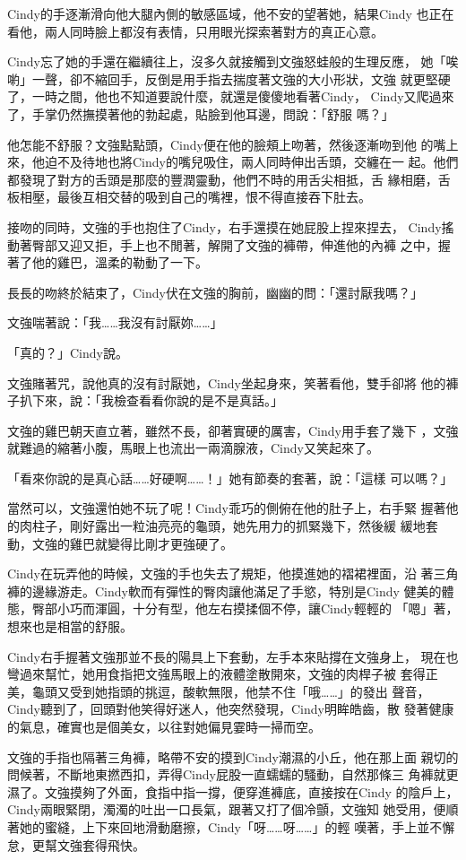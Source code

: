 Cindy的手逐漸滑向他大腿內側的敏感區域，他不安的望著她，結果Cindy
也正在看他，兩人同時臉上都沒有表情，只用眼光探索著對方的真正心意。

Cindy忘了她的手還在繼續往上，沒多久就接觸到文強怒蛙般的生理反應，
她「唉喲」一聲，卻不縮回手，反倒是用手指去揣度著文強的大小形狀，文強
就更堅硬了，一時之間，他也不知道要說什麼，就還是傻傻地看著Cindy，
Cindy又爬過來了，手掌仍然撫摸著他的勃起處，貼臉到他耳邊，問說：「舒服
嗎？」

他怎能不舒服？文強點點頭，Cindy便在他的臉頰上吻著，然後逐漸吻到他
的嘴上來，他迫不及待地也將Cindy的嘴兒吸住，兩人同時伸出舌頭，交纏在一
起。他們都發現了對方的舌頭是那麼的豐潤靈動，他們不時的用舌尖相抵，舌
緣相磨，舌板相壓，最後互相交替的吸到自己的嘴裡，恨不得直接吞下肚去。

接吻的同時，文強的手也抱住了Cindy，右手還摸在她屁股上捏來捏去，
Cindy搖動著臀部又迎又拒，手上也不閒著，解開了文強的褲帶，伸進他的內褲
之中，握著了他的雞巴，溫柔的勒動了一下。

長長的吻終於結束了，Cindy伏在文強的胸前，幽幽的問：「還討厭我嗎？」

文強喘著說：「我……我沒有討厭妳……」

「真的？」Cindy說。

文強賭著咒，說他真的沒有討厭她，Cindy坐起身來，笑著看他，雙手卻將
他的褲子扒下來，說：「我檢查看看你說的是不是真話。」

文強的雞巴朝天直立著，雖然不長，卻著實硬的厲害，Cindy用手套了幾下
，文強就難過的縮著小腹，馬眼上也流出一兩滴腺液，Cindy又笑起來了。

「看來你說的是真心話……好硬啊……！」她有節奏的套著，說：「這樣
可以嗎？」

當然可以，文強還怕她不玩了呢！Cindy乖巧的側俯在他的肚子上，右手緊
握著他的肉柱子，剛好露出一粒油亮亮的龜頭，她先用力的抓緊幾下，然後緩
緩地套動，文強的雞巴就變得比剛才更強硬了。

Cindy在玩弄他的時候，文強的手也失去了規矩，他摸進她的褶裙裡面，沿
著三角褲的邊緣游走。Cindy軟而有彈性的臀肉讓他滿足了手慾，特別是Cindy
健美的體態，臀部小巧而渾圓，十分有型，他左右摸揉個不停，讓Cindy輕輕的
「嗯」著，想來也是相當的舒服。

Cindy右手握著文強那並不長的陽具上下套動，左手本來貼撐在文強身上，
現在也彎過來幫忙，她用食指把文強馬眼上的液體塗散開來，文強的肉桿子被
套得正美，龜頭又受到她指頭的挑逗，酸軟無限，他禁不住「哦……」的發出
聲音，Cindy聽到了，回頭對他笑得好迷人，他突然發現，Cindy明眸皓齒，散
發著健康的氣息，確實也是個美女，以往對她偏見霎時一掃而空。

文強的手指也隔著三角褲，略帶不安的摸到Cindy潮濕的小丘，他在那上面
親切的問候著，不斷地東撚西扣，弄得Cindy屁股一直蠕蠕的騷動，自然那條三
角褲就更濕了。文強摸夠了外面，食指中指一撐，便穿進褲底，直接按在Cindy
的陰戶上，Cindy兩眼緊閉，濁濁的吐出一口長氣，跟著又打了個冷顫，文強知
她受用，便順著她的蜜縫，上下來回地滑動磨擦，Cindy「呀……呀……」的輕
嘆著，手上並不懈怠，更幫文強套得飛快。

